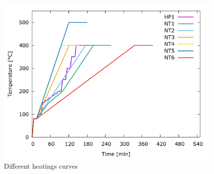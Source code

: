 \documentclass[a4paper]{article}
\begin{document}
\begin{figure}
	\centering
	\includegraphics[width=.7\textwidth]{../Data/Graphs/hp1.png}
	\caption{Different heatings curves}
	\label{fig:heat}
\end{figure}
\end{document}

